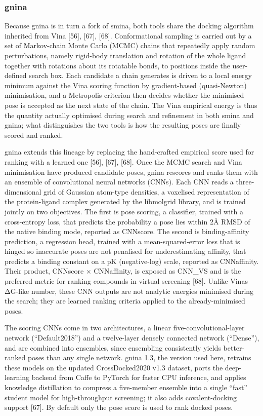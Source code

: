 \hypertarget{gnina-1}{%
\subsubsection{gnina}\label{gnina-1}}

Because gnina is in turn a fork of smina, both tools share the docking algorithm inherited from Vina {[}56{]}, {[}67{]}, {[}68{]}. Conformational sampling is carried out by a set of Markov-chain Monte Carlo (MCMC) chains that repeatedly apply random perturbations, namely rigid-body translation and rotation of the whole ligand together with rotations about its rotatable bonds, to positions inside the user-defined search box. Each candidate a chain generates is driven to a local energy minimum against the Vina scoring function by gradient-based (quasi-Newton) minimisation, and a Metropolis criterion then decides whether the minimised pose is accepted as the next state of the chain. The Vina empirical energy is thus the quantity actually optimised during search and refinement in both smina and gnina; what distinguishes the two tools is how the resulting poses are finally scored and ranked.

gnina extends this lineage by replacing the hand-crafted empirical score used for ranking with a learned one {[}56{]}, {[}67{]}, {[}68{]}. Once the MCMC search and Vina minimisation have produced candidate poses, gnina rescores and ranks them with an ensemble of convolutional neural networks (CNNs). Each CNN reads a three-dimensional grid of Gaussian atom-type densities, a voxelised representation of the protein-ligand complex generated by the libmolgrid library, and is trained jointly on two objectives. The first is pose scoring, a classifier, trained with a cross-entropy loss, that predicts the probability a pose lies within 2Å RMSD of the native binding mode, reported as CNNscore. The second is binding-affinity prediction, a regression head, trained with a mean-squared-error loss that is hinged so inaccurate poses are not penalised for underestimating affinity, that predicts a binding constant on a pK (negative-log) scale, reported as CNNaffinity. Their product, CNNscore × CNNaffinity, is exposed as CNN\_VS and is the preferred metric for ranking compounds in virtual screening {[}68{]}. Unlike Vina\textquotesingle s ΔG-like number, these CNN outputs are not analytic energies minimised during the search; they are learned ranking criteria applied to the already-minimised poses.

The scoring CNNs come in two architectures, a linear five-convolutional-layer network (``Default2018'') and a twelve-layer densely connected network (``Dense''), and are combined into ensembles, since ensembling consistently yields better-ranked poses than any single network. gnina 1.3, the version used here, retrains these models on the updated CrossDocked2020 v1.3 dataset, ports the deep-learning backend from Caffe to PyTorch for faster CPU inference, and applies knowledge distillation to compress a five-member ensemble into a single ``fast'' student model for high-throughput screening; it also adds covalent-docking support {[}67{]}. By default only the pose score is used to rank docked poses.


